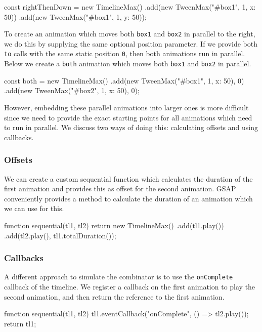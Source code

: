 \begin{js}
const rightThenDown = new TimelineMax()
  .add(new TweenMax("#box1", 1, {x: 50}))
  .add(new TweenMax("#box1", 1, {y: 50}));
\end{js}

To create an animation which moves both \texttt{box1} and \texttt{box2} in parallel to the right, we do this by supplying the same optional position parameter. If we provide both \texttt{to} calls with the same static position \texttt{0}, then both animations run in parallel. Below we create a \texttt{both} animation which moves both \texttt{box1} and \texttt{box2} in parallel.

\begin{js}
const both = new TimelineMax()
  .add(new TweenMax("#box1", 1, {x: 50}), 0)
  .add(new TweenMax("#box2", 1, {x: 50}), 0);
\end{js}

However, embedding these parallel animations into larger ones is more difficult since we need to provide the exact starting points for all animations which need to run in parallel. We discuss two ways of doing this: calculating offsets and using callbacks.

\subsubsection{Offsets}

We can create a custom sequential function which calculates the duration of the first animation and provides this as offset for the second animation. GSAP conveniently provides a method to calculate the duration of an animation which we can use for this.

\begin{js}
function sequential(tl1, tl2) {
  return new TimelineMax()
    .add(tl1.play())
    .add(tl2.play(), tl1.totalDuration());
}
\end{js}

\subsubsection{Callbacks}

A different approach to simulate the  combinator is to use the \texttt{onComplete} callback of the timeline. We register a callback on the first animation to play the second animation, and then return the reference to the first animation.

\begin{js}
function sequential(tl1, tl2) {
  tl1.eventCallback("onComplete", () => tl2.play());
  return tl1;
}
\end{js}

